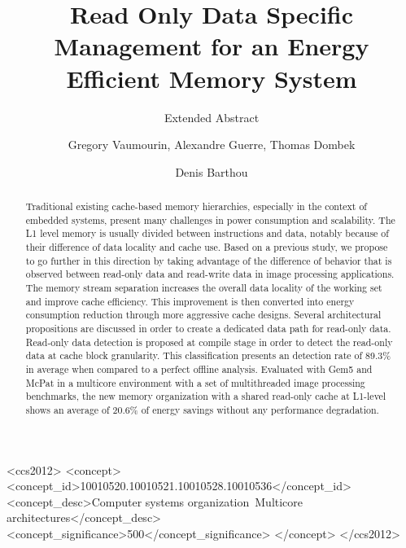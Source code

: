 \documentclass[sigconf]{acmart}
\begin{document}
\title{Read Only Data Specific Management for an Energy Efficient Memory System}
\subtitle{Extended Abstract}


\author{Gregory Vaumourin, Alexandre Guerre, Thomas Dombek}


\author{Denis Barthou}


\begin{abstract}
Traditional existing cache-based memory hierarchies, especially in the context of embedded systems, present many challenges in power consumption and scalability. The L1 level memory is usually divided between instructions and data, notably because of their difference of data locality and cache use. Based on a previous study\cite{vaumourin:2014}, we propose to go further in this direction by taking advantage of the difference of behavior that is observed between read-only data and read-write data in image processing applications. The memory stream separation increases the overall data locality of the working set and improve cache efficiency. This improvement is then converted into energy consumption reduction through more aggressive cache designs. Several architectural propositions are discussed in order to create a dedicated data path for read-only data. Read-only data detection is proposed at compile stage in order to detect the read-only data at cache block granularity. This classification presents an detection rate of 89.3\% in average when compared to a perfect offline analysis. Evaluated with Gem5 and McPat in a multicore environment with a set of multithreaded image processing benchmarks, the new memory organization with a shared read-only cache at L1-level shows an average of 20.6\% of energy savings without any performance degradation. 

\end{abstract}

%
%

 \begin{CCSXML}
<ccs2012>
<concept>
<concept_id>10010520.10010521.10010528.10010536</concept_id>
<concept_desc>Computer systems organization~Multicore architectures</concept_desc>
<concept_significance>500</concept_significance>
</concept>
</ccs2012>
\end{CCSXML}
\end{document}
